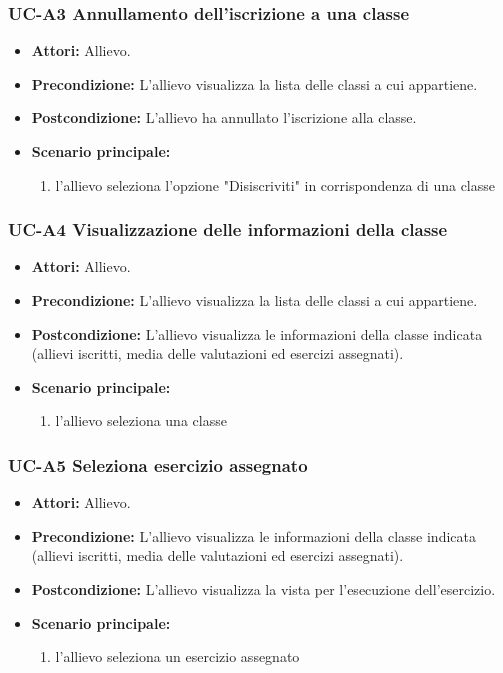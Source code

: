 	\subsubsection{UC-A3 Annullamento dell'iscrizione a una classe}
		\begin{itemize}
			\item \textbf{Attori:} Allievo.
			\item \textbf{Precondizione:} L'allievo visualizza la lista delle classi a cui appartiene.
			\item \textbf{Postcondizione:} L'allievo ha annullato l'iscrizione alla classe.
			\item \textbf{Scenario principale:}
			\begin{enumerate}
				\item l'allievo seleziona l'opzione "Disiscriviti" in corrispondenza di una classe
			\end{enumerate}
		\end{itemize}					
				
	\subsubsection{UC-A4 Visualizzazione delle informazioni della classe}
		\begin{itemize}
			\item \textbf{Attori:} Allievo.
			\item \textbf{Precondizione:} L'allievo visualizza la lista delle classi a cui appartiene.
			\item \textbf{Postcondizione:} L'allievo visualizza le informazioni della classe indicata (allievi iscritti, media delle valutazioni ed esercizi assegnati).
			\item \textbf{Scenario principale:}
			\begin{enumerate}
				\item l'allievo seleziona una classe
			\end{enumerate}
		\end{itemize}
		
\subsubsection{UC-A5 Seleziona esercizio assegnato}
\begin{itemize}
			\item \textbf{Attori:} Allievo.
			\item \textbf{Precondizione:} L'allievo visualizza le informazioni della classe indicata (allievi iscritti, media delle valutazioni ed esercizi assegnati).
			\item \textbf{Postcondizione:} L'allievo visualizza la vista per l'esecuzione dell'esercizio.
			\item \textbf{Scenario principale:}
			\begin{enumerate}
				\item l'allievo seleziona un esercizio assegnato
			\end{enumerate}
		\end{itemize}
